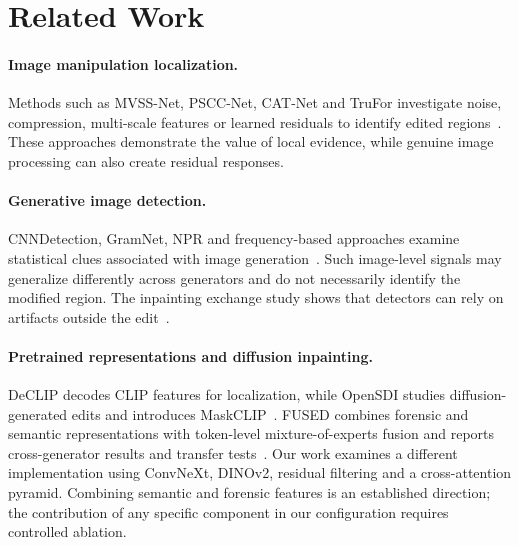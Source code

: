 \section{Related Work}
\label{sec:related}
\paragraph{Image manipulation localization.} Methods such as MVSS-Net, PSCC-Net, CAT-Net and TruFor investigate noise, compression, multi-scale features or learned residuals to identify edited regions~\cite{mvss,pscc,catnet,trufor}. These approaches demonstrate the value of local evidence, while genuine image processing can also create residual responses.

\paragraph{Generative image detection.} CNNDetection, GramNet, NPR and frequency-based approaches examine statistical clues associated with image generation~\cite{cnndet,gramnet,npr,freqnet}. Such image-level signals may generalize differently across generators and do not necessarily identify the modified region. The inpainting exchange study shows that detectors can rely on artifacts outside the edit~\cite{inpx}.

\paragraph{Pretrained representations and diffusion inpainting.} DeCLIP decodes CLIP features for localization, while OpenSDI studies diffusion-generated edits and introduces MaskCLIP~\cite{declip,opensdi}. FUSED combines forensic and semantic representations with token-level mixture-of-experts fusion and reports cross-generator results and transfer tests~\cite{fused}. Our work examines a different implementation using ConvNeXt, DINOv2, residual filtering and a cross-attention pyramid. Combining semantic and forensic features is an established direction; the contribution of any specific component in our configuration requires controlled ablation.
